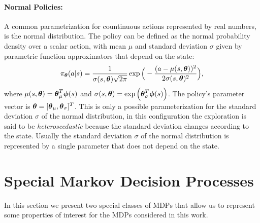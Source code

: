 \paragraph{Normal Policies:}
A common parametrization for countinuous actions represented by real numbers, is the normal distribution. The policy can be defined as the normal probability density over a scalar action, with mean $\mu$ and standard deviation $\sigma$ given by parametric function approximators that depend on the state:
\begin{align} \pi_{\boldsymbol{\theta}}(a|s) = \frac{1}{\sigma(s, \boldsymbol{\theta})\sqrt{2\pi}}\exp\Big( -\frac{(a -\mu(s, \boldsymbol{\theta}))^2}{2\sigma(s, \boldsymbol{\theta})^2}\Big), \end{align}
where $\mu(s, \boldsymbol{\theta}) = \boldsymbol{\theta}_{\mu}^{T} \boldsymbol{\phi}(s)$ and $\sigma(s, \boldsymbol{\theta}) = \exp\Big( \boldsymbol{\theta}_{\sigma}^{T}\boldsymbol{\phi}(s) \Big)$. The policy's parameter vector is $\boldsymbol{\theta} = [\boldsymbol{\theta}_{\mu}, \boldsymbol{\theta}_{\sigma}]^{T}$. This is only a possible parameterization for the standard deviation $\sigma$ of the normal distribution, in this configuration the exploration is said to be \emph{heteroscedastic} because the standard deviation changes according to the state. Usually the standard deviation $\sigma$ of the normal distribution is represented by a single parameter that does not depend on the state.

\section{Special Markov Decision Processes} \label{sec:specmdp}
In this section we present two special classes of \ac{MDPs} that allow us to represent some properties of interest for the \ac{MDPs} considered in this work.

